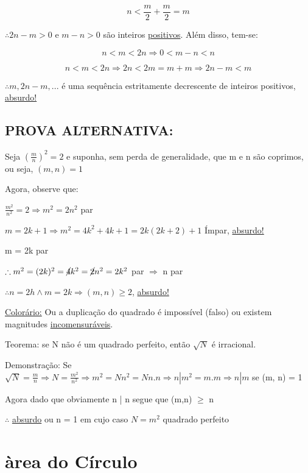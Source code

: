 \documentclass[a4paper, 12pt]{article}
\begin{document}
\[n < \frac{m}{2} + \frac{m}{2} = m\]

{$\therefore 2n-m > 0$ e $ m-n > 0$ são inteiros \underline{positivos}. Além disso, tem-se:}

\[n < m < 2n \Rightarrow 0 < m-n < n\]

\[n < m < 2n \Rightarrow 2n < 2m = m + m \Rightarrow 2n - m < m\]


{$\therefore m, 2n-m,...$ é uma sequência estritamente decrescente de inteiros positivos, \underline{absurdo!}}

\subsection{PROVA ALTERNATIVA:} 

{Seja $(\frac{m}{n})^2 = 2$ e suponha, sem perda de generalidade, que m e n são coprimos, ou seja, $(m,n)=1$}

Agora, observe que:

\begin{center}
$\frac{m^2}{n^2} = 2 \Rightarrow m^2 = 2n^2$ par 

$m = 2k + 1 \Rightarrow m^2 = 4k^2 + 4k + 1 = 2k(2k + 2) + 1$ Ímpar, \underline{absurdo!}

{m = 2k par}

$\therefore m^2 = (2k)^2 = \cancel{4}k^2 = \cancel{2}n^2 = 2k^2$ par $\Rightarrow$ n par

$\therefore n = 2h \wedge  m = 2k \Rightarrow (m,n) \ge 2$, \underline{absurdo!}
\end{center}

\underline{Colorário:} Ou a duplicação do quadrado é impossível (falso) ou existem magnitudes \underline{incomensuráveis}.

Teorema: se N não é um quadrado perfeito, então $\sqrt{N}$ é irracional.

Demonstração: Se $\sqrt{N} = \frac{m}{n} \Rightarrow N = \frac{m^2}{n^2} \Rightarrow m^2 = Nn^2 = Nn.n \Rightarrow n | m^2 = m.m \Rightarrow n | m$ se (m, n) = 1 

Agora dado que obviamente n | n segue que (m,n) $\ge$ n

$\therefore$ \underline{absurdo} ou n = 1 em cujo caso $N = m^2$ quadrado perfeito

\newpage

\section{àrea do Círculo}
\end{document}
